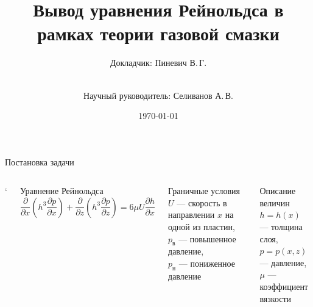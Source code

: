 \documentclass[ignoreonframetext,unicode]{beamer}
\title[Вывод уравнения Рейнольдса]{Вывод уравнения Рейнольдса в рамках теории газовой смазки}
\author[Пиневич В.\,Г.]{Докладчик: Пиневич В.\,Г.\and\\[0.5mm] Научный руководитель: Селиванов А.\,В.}
\institute[каф. Прикладная математика ФН-2]{группа ФН2-61Б}
\date{\today}
\begin{document}
	
	\begin{frame}[plain]
		\maketitle
	\end{frame}

	\begin{frame}{Постановка задачи}
		\begin{columns}
			\column{\textwidth}`
			\begin{block}{Уравнение Рейнольдса}
			 \[
				\frac{\partial}{\partial x} \left(h^3 \frac{\partial p}{\partial x} \right) + \frac{\partial}{\partial z} \left(h^3 \frac{\partial p}{\partial z} \right) = 6 \mu U \frac{\partial h}{\partial x}
			 \]
			\end{block}

		\begin{columns}
			\begin{block}{Граничные условия}
				$U$ --- скорость в направлении $x$ на одной из пластин,\\ 
				$p_{\text{в}}$ --- повышенное давление,\\ 
				$p_{\text{н}}$ --- пониженное давление
			\end{block}
		\begin{block}{Описание величин}
		$h = h(x)$ --- толщина слоя, \\
		$p = p(x, z)$ --- давление, \\
		$\mu$ --- коэффициент вязкости
		\end{block}
		\end{columns}

		\end{columns}
		
	\end{frame}
\end{document}
